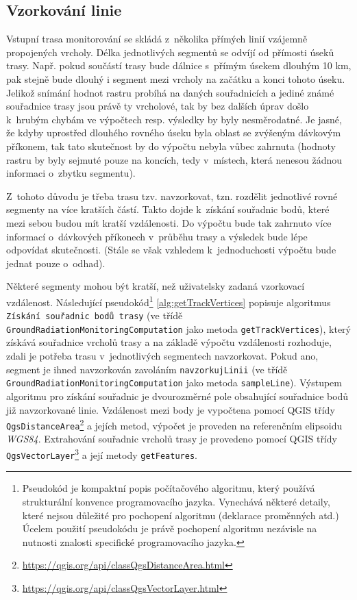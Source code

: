 \subsection{Vzorkování linie}
\label{subsec:vzorkovaniLinie} Vstupní trasa monitorování se skládá
z~několika přímých linií vzájemně propojených vrcholy. Délka
jednotlivých segmentů se odvíjí od přímosti úseků trasy. Např. pokud
součástí trasy bude dálnice s~přímým úsekem dlouhým 10 km, pak stejně
bude dlouhý i segment mezi vrcholy na začátku a konci tohoto
úseku. Jelikož snímání hodnot rastru probíhá na daných souřadnicích a
jediné známé souřadnice trasy jsou právě ty vrcholové, tak by bez
dalších úprav došlo k~hrubým chybám ve výpočtech resp. výsledky by
byly nesměrodatné. Je jasné, že kdyby uprostřed dlouhého rovného úseku
byla oblast se zvýšeným dávkovým příkonem, tak tato skutečnost by do
výpočtu nebyla vůbec zahrnuta (hodnoty rastru by byly sejmuté pouze na
koncích, tedy v~místech, která nenesou žádnou informaci o~zbytku
segmentu).

Z~tohoto důvodu je třeba trasu tzv. navzorkovat, tzn. rozdělit
jednotlivé rovné segmenty na více kratších částí. Takto dojde
k~získání souřadnic bodů, které mezi sebou budou mít kratší
vzdálenosti. Do výpočtu bude tak zahrnuto více informací o~dávkových
příkonech v~průběhu trasy a výsledek bude lépe odpovídat
skutečnosti. (Stále se však vzhledem k~jednoduchosti výpočtu bude
jednat pouze o~odhad).

Některé segmenty mohou být kratší, než uživatelsky zadaná vzorkovací
vzdálenost. Následující pseudokód\footnote{Pseudokód je kompaktní
popis počítačového algoritmu, který používá strukturální konvence
programovacího jazyka. Vynechává některé detaily, které nejsou
důležité pro pochopení algoritmu (deklarace proměnných atd.) Úcelem
použití pseudokódu je právě pochopení algoritmu nezávisle na nutnosti
znalosti specifické programovacího jazyka.\cite{pseudocode}}
\ref{alg:getTrackVertices} popisuje algoritmus \texttt{Získání
souřadnic bodů trasy} (ve třídě
\texttt{GroundRadiationMonitoringComputation} jako metoda
\texttt{getTrackVertices}), který získává souřadnice vrcholů trasy a
na základě výpočtu vzdálenosti rozhoduje, zdali je potřeba trasu
v~jednotlivých segmentech navzorkovat. Pokud ano, segment je ihned
navzorkován zavoláním \texttt{navzorkujLinii} (ve třídě \\
\texttt{GroundRadiationMonitoringComputation} jako metoda
\texttt{sampleLine}). Výstupem algoritmu pro získání souřadnic je
dvourozměrné pole obsahující souřadnice bodů již navzorkované
linie. Vzdálenost mezi body je vypočtena pomocí QGIS třídy
\texttt{QgsDistanceArea}\footnote{\url{https://qgis.org/api/classQgsDistanceArea.html}}
a jejích metod, výpočet je proveden na referenčním elipsoidu
\textit{WGS84}. Extrahování souřadnic vrcholů trasy je provedeno
pomocí QGIS třídy
\texttt{QgsVectorLayer}\footnote{\url{https://qgis.org/api/classQgsVectorLayer.html}}
a její metody \texttt{getFeatures}.

